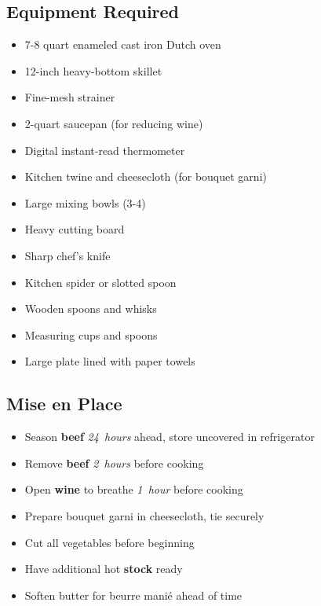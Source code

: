 \documentclass[11pt,letterpaper]{article}
\begin{document}
{\footnotesize
\setlength{\columnsep}{20pt}
\setlength{\multicolsep}{6pt}
\begin{multicols}{2}
\setlength{\parindent}{0pt}
\setlength{\parskip}{2pt}
\setlength{\itemsep}{0pt}
\setlength{\parsep}{0pt}

\subsection*{Equipment Required}
\begin{itemize}
    \item 7-8 quart enameled cast iron Dutch oven
    \item 12-inch heavy-bottom skillet
    \item Fine-mesh strainer
    \item 2-quart saucepan (for reducing wine)
    \item Digital instant-read thermometer
    \item Kitchen twine and cheesecloth (for bouquet garni)
    \item Large mixing bowls (3-4)
    \item Heavy cutting board
    \item Sharp chef's knife
    \item Kitchen spider or slotted spoon
    \item Wooden spoons and whisks
    \item Measuring cups and spoons
    \item Large plate lined with paper towels
\end{itemize}

\subsection*{Mise en Place}
\begin{itemize}
    \item Season \textbf{beef} \textit{24~hours} ahead, store uncovered in refrigerator
    \item Remove \textbf{beef} \textit{2~hours} before cooking
    \item Open \textbf{wine} to breathe \textit{1~hour} before cooking
    \item Prepare bouquet garni in cheesecloth, tie securely
    \item Cut all vegetables before beginning
    \item Have additional hot \textbf{stock} ready
    \item Soften butter for beurre manié ahead of time
\end{itemize}


\end{multicols}}
\end{document}
